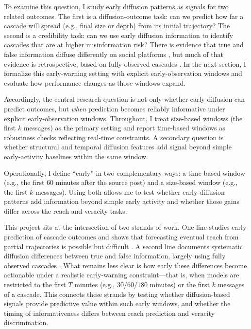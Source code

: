 To examine this question, I study early diffusion patterns as signals for two related outcomes. The first is a diffusion-outcome task: can we predict how far a cascade will spread (e.g., final size or depth) from its initial trajectory? The second is a credibility task: can we use early diffusion information to identify cascades that are at higher misinformation risk? There is evidence that true and false information diffuse differently on social platforms \citep{vosoughi_spread_2018}, but much of that evidence is retrospective, based on fully observed cascades \citep{del_vicario_spreading_2016}. In the next section, I formalize this early-warning setting with explicit early-observation windows and evaluate how performance changes as those windows expand.


Accordingly, the central research question is not only whether early diffusion can predict outcomes, but \emph{when} prediction becomes reliably informative under explicit early-observation windows. Throughout, I treat size-based windows (the first $k$ messages) as the primary setting and report time-based windows as robustness checks reflecting real-time constraints. A secondary question is whether structural and temporal diffusion features add signal beyond simple early-activity baselines within the same window.

Operationally, I define “early” in two complementary ways: a time-based window (e.g., the first 60 minutes after the source post) and a size-based window (e.g., the first $k$ messages). Using both allows me to test whether early diffusion patterns add information beyond simple early activity and whether those gains differ across the reach and veracity tasks.

This project sits at the intersection of two strands of work. One line studies early prediction of cascade outcomes and shows that forecasting eventual reach from partial trajectories is possible but difficult \citep{cheng_can_2014,szabo_predicting_2010}. A second line documents systematic diffusion differences between true and false information, largely using fully observed cascades \citep{vosoughi_spread_2018}. What remains less clear is how early these differences become actionable under a realistic early-warning constraint---that is, when models are restricted to the first $T$ minutes (e.g., 30/60/180 minutes) or the first $k$ messages of a cascade. This connects these strands by testing whether diffusion-based signals provide predictive value within such early windows, and whether the timing of informativeness differs between reach prediction and veracity discrimination.

